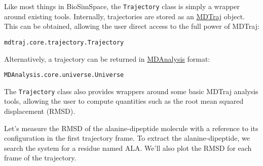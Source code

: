 Like most things in BioSimSpace, the \texttt{Trajectory} class is simply
a wrapper around existing tools. Internally, trajectories are stored as
an \href{http://mdtraj.org}{MDTraj} object. This can be obtained,
allowing the user direct access to the full power of MDTraj:

\begin{Shaded}
\begin{Highlighting}[]
\OperatorTok{=}
\end{Highlighting}
\end{Shaded}

\begin{verbatim}
mdtraj.core.trajectory.Trajectory
\end{verbatim}

Alternatively, a trajectory can be returned in
\href{https://www.mdanalysis.org}{MDAnalysis} format:

\begin{Shaded}
\begin{Highlighting}[]
\OperatorTok{=}\OperatorTok{=}\NormalTok{)}
\end{Highlighting}
\end{Shaded}

\begin{verbatim}
MDAnalysis.core.universe.Universe
\end{verbatim}

The \texttt{Trajectory} class also provides wrappers around some basic
MDTraj analysis tools, allowing the user to compute quantities such as
the root mean squared displacement (RMSD).

Let's measure the RMSD of the alanine-dipeptide molecule with a
reference to its configuration in the first trajectory frame. To extract
the alanine-dipeptide, we search the system for a residue named ALA.
We'll also plot the RMSD for each frame of the trajectory.

